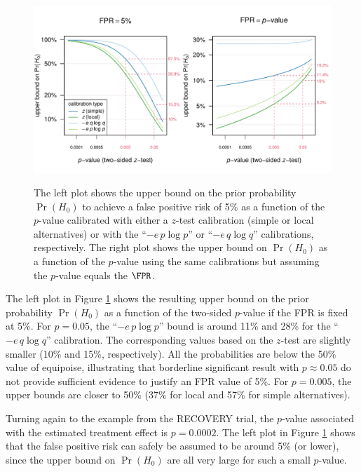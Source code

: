 \begin{figure}[!htb]
\begin{knitrout}
\color{fgcolor}
{\centering \includegraphics[width=\maxwidth]{images/paper4/FPR-plot-1}
}
\end{knitrout}
\caption{The left plot shows the upper bound on the prior probability $\Pr(H_0)$
  to achieve a false positive risk of 5\% as a function of the $p$-value
  calibrated with either a $z$-test calibration (simple or local alternatives)
  or with the ``$- e \, p \log p$'' or ``$- e \, q \log q$'' calibrations,
  respectively. The right plot shows the upper bound on $\Pr(H_0)$ as a function
  of the $p$-value using the same calibrations but assuming the $p$-value equals
  the $\FPR$.}
\label{fig4:fpr}
\end{figure}

The left plot in Figure \ref{fig4:fpr} shows the resulting upper bound on the
prior probability $\Pr(H_0)$ as a function of the two-sided $p$-value if the FPR
is fixed at 5\%. For $p=0.05$, the ``$- e \, p \log p$'' bound is around 11\%
and 28\% for the ``$- e \, q \log q$'' calibration. The corresponding values
based on the $z$-test are slightly smaller (10\% and 15\%, respectively). All
the probabilities are below the 50\% value of equipoise, illustrating that
borderline significant result with $p \approx 0.05$ do not provide sufficient
evidence to justify an FPR value of 5\%. For $p=0.005$, the upper bounds are
closer to 50\% (37\% for local and 57\% for simple alternatives).


Turning again to the example from the RECOVERY trial, the $p$-value associated
with the estimated treatment effect is $p = 0.0002$. The left plot in Figure
\ref{fig4:fpr} shows that the false positive risk can safely be assumed to be
around 5\% (or lower), since the upper bound on $\Pr(H_0)$ are all very large
for such a small $p$-value.

